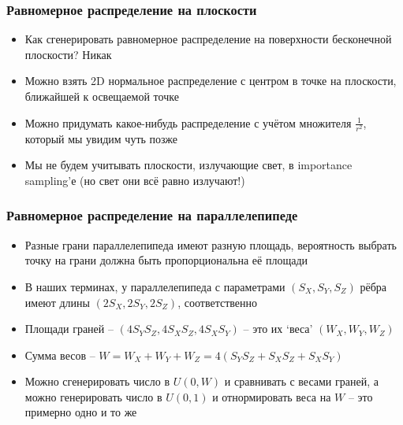 \documentclass[handout,10pt]{beamer}
\begin{document}
\begin{frame}
\frametitle{Равномерное распределение на плоскости}
\begin{itemize}
\item Как сгенерировать равномерное распределение на поверхности бесконечной плоскости? \pause Никак
\pause
\item Можно взять 2D нормальное распределение с центром в точке на плоскости, ближайшей к освещаемой точке
\pause
\item Можно придумать какое-нибудь распределение с учётом множителя \begin{math}\frac{1}{r^2}\end{math}, который мы увидим чуть позже
\pause
\item Мы не будем учитывать плоскости, излучающие свет, в importance sampling'е (но свет они всё равно излучают!)
\end{itemize}
\end{frame}

\begin{frame}
\frametitle{Равномерное распределение на параллелепипеде}
\begin{itemize}
\item Разные грани параллелепипеда имеют разную площадь, вероятность выбрать точку на грани должна быть пропорциональна её площади
\pause
\item В наших терминах, у параллелепипеда с параметрами \begin{math}(S_X,S_Y,S_Z)\end{math} рёбра имеют длины \begin{math}(2S_X, 2S_Y, 2S_Z)\end{math}, соответственно
\pause
\item Площади граней -- \begin{math}(4 S_Y S_Z,4 S_X S_Z,4 S_X S_Y)\end{math} -- это их `веса' \begin{math}(W_X,W_Y,W_Z)\end{math}
\pause
\item Сумма весов -- \begin{math}W = W_X+W_Y+W_Z=4(S_YS_Z+S_XS_Z+S_XS_Y)\end{math}
\pause
\item Можно сгенерировать число в \begin{math}U(0, W)\end{math} и сравнивать с весами граней, а можно генерировать число в \begin{math}U(0,1)\end{math} и отнормировать веса на \begin{math}W\end{math} -- это примерно одно и то же
\end{itemize}
\end{frame}
\end{document}
